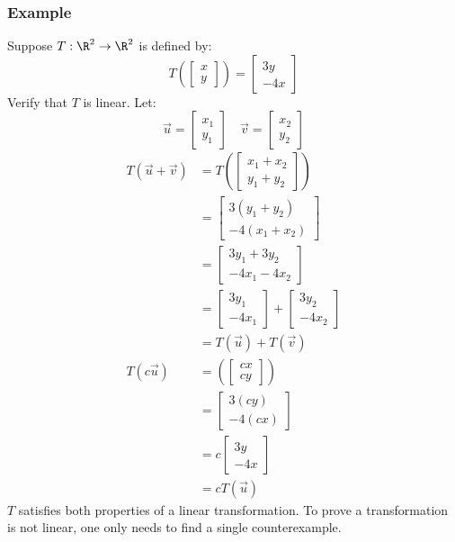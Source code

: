 \documentclass{math}
\begin{document}
\subsubsection*{Example}
Suppose \( T:\R^2\to\R^2 \) is defined by:
\[ T\left(\begin{bmatrix}x \\ y\end{bmatrix}\right) = \begin{bmatrix}3y \\
  -4x\end{bmatrix} \]
Verify that \( T \) is linear. Let:
\[ \vec{u} = \begin{bmatrix}x_1 \\ y_1\end{bmatrix} \quad
  \vec{v} = \begin{bmatrix}x_2 \\ y_2\end{bmatrix} \]
\begin{align*}
  T(\vec{u}+\vec{v}) &=
    T\left(\begin{bmatrix}x_1+x_2 \\ y_1+y_2\end{bmatrix}\right) \\
  &= \begin{bmatrix}
    3(y_1+y_2) \\
    -4(x_1+x_2)
  \end{bmatrix} \\
  &= \begin{bmatrix}
    3y_1+3y_2 \\
    -4x_1-4x_2
  \end{bmatrix} \\
  &= \begin{bmatrix}
    3y_1 \\
    -4x_1
  \end{bmatrix}+\begin{bmatrix}
    3y_2 \\
    -4x_2
  \end{bmatrix} \\
  &= T(\vec{u})+T(\vec{v}) \\
  T(c\vec{u}) &= \left(\begin{bmatrix}cx \\ cy\end{bmatrix}\right) \\
  &= \begin{bmatrix}
    3(cy) \\
    -4(cx)
  \end{bmatrix} \\
  &= c\begin{bmatrix}
    3y \\
    -4x
  \end{bmatrix} \\
  &= cT(\vec{u})
\end{align*}
\( T \) satisfies both properties of a linear transformation. To prove a
transformation is not linear, one only needs to find a single counterexample.
\end{document}
